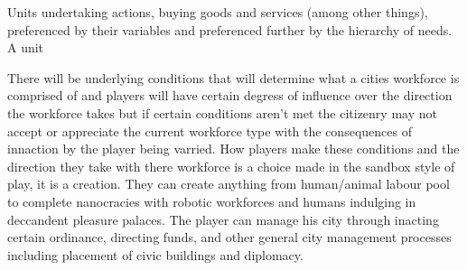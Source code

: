 Units undertaking actions, buying goods and services (among other things), preferenced by their variables and preferenced further by the hierarchy of needs. A unit 



 



There will be underlying conditions that will determine what a cities workforce is comprised of and players will have certain degress of influence over the direction the workforce takes but if certain conditions aren't met the citizenry may not accept or appreciate the current workforce type with the consequences of innaction by the player being varried. How players make these conditions and the direction they take with there workforce is a choice made in the sandbox style of play, it is a creation. They can create anything from human/animal labour pool to complete nanocracies with robotic workforces and humans indulging in deccandent pleasure palaces. The player can manage his city through inacting certain ordinance, directing funds, and other general city management processes including placement of civic buildings and diplomacy. 

